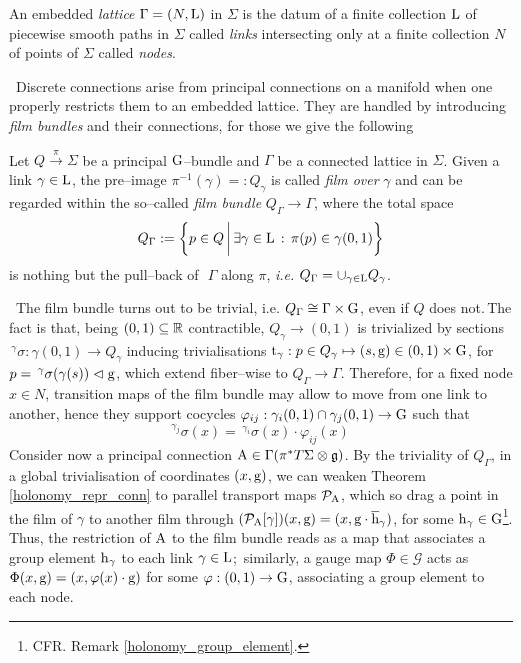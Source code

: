  \begin{defi}[Lattice]
    An embedded \emph{lattice} $\Gamma=(N,\text{\normalfont L})$ in $\Sigma$ is the datum of a finite collection $\text{\normalfont L}$ of piecewise smooth paths in $\Sigma$ called \emph{links} intersecting only at a finite collection $N$ of points of $\Sigma$ called \emph{nodes}. 
\end{defi}
\,\newline
 Discrete connections arise from principal connections on a manifold when one properly restricts them to an embedded lattice. They are handled by introducing \emph{film bundles} %
 and their connections, for those we give the following
\begin{defi}
    Let $Q\xrightarrow{\pi}\Sigma$ be a principal $\text{\normalfont G}$--bundle and $\Gamma$ be a connected lattice in $\Sigma$. Given a link $\gamma\in\text{\normalfont L}$, the pre--image $\pi^{-1}(\gamma)=:Q_\gamma$ is called \emph{film over} $\gamma$ and can be regarded within the so--called \emph{film bundle} $Q_\Gamma\to\Gamma$, where the total space
    $$Q_\Gamma:=\bigg\{p\in Q\,\bigg|\,\exists\gamma\in\text{\normalfont L}\,:\,\pi(p)\in\gamma(0,1)\bigg\}$$
    is nothing but the pull--back of \,\,$\Gamma$ along $\pi$, \emph{i.e.} $Q_\Gamma=\cup_{\gamma\in\text{\normalfont L}}Q_\gamma$.
\end{defi}
\,\newline
The film bundle turns out to be trivial, i.e. $Q_\Gamma\cong\Gamma\times\text{\normalfont G}$, even if $Q$ does not.\,The fact is that, being $(0,1)\subseteq\mathbb{R}$ contractible, $Q_\gamma\to(0,1)$ is trivialized by sections $\,^\gamma\sigma:\gamma(0,1)\to Q_\gamma$ inducing trivialisations $\text{\normalfont t}_\gamma:p\in Q_\gamma\mapsto(s,\text{\normalfont g})\in(0,1)\times\text{\normalfont G}$, for $p=\,^\gamma\sigma(\gamma(s))\vartriangleleft\text{\normalfont g}$, which extend fiber--wise to $Q_\Gamma\to\Gamma$. Therefore, for a fixed node $x\in N$, transition maps of the film bundle may allow to move from one link to another, hence they support cocycles $\varphi_{ij}:\gamma_i(0,1)\cap\gamma_j(0,1)\to\text{\normalfont G}$ such that
$$\,^{\gamma_j}\sigma(x)=\,^{\gamma_i}\sigma(x)\cdot\varphi_{ij}(x)\
$$
Consider now a principal connection $\text{\normalfont A}\in\Gamma(\pi^*T\Sigma\otimes\mathfrak{g})$. By the triviality of $Q_\Gamma$, in a global trivialisation of coordinates $(x,\text{\normalfont g})$, we can weaken Theorem \ref{holonomy_repr_conn} to parallel transport maps $\mathcal{P}_{\text{\normalfont A}}$, which so drag a point in the film of $\gamma$ to another film through $(\mathcal{P}_{\text{\normalfont A}}[\gamma])(x,\text{\normalfont g})=(x,\text{\normalfont g}\cdot\overline{\text{\normalfont h}}_\gamma)$, for some $\text{\normalfont h}_\gamma\in\text{\normalfont G}$\footnote{CFR. Remark \ref{holonomy_group_element}.}. Thus, the restriction of $\text{\normalfont A}$ to the film bundle reads as a map that associates a group element $\text{\normalfont h}_\gamma$ to each link $\gamma\in\text{\normalfont L}$;\, similarly, a gauge map $\Phi\in\mathscr{G}$ acts as $\Phi(x,\text{\normalfont g})=(x,\varphi(x)\cdot\text{\normalfont g})$ for some $\varphi:(0,1)\to\text{\normalfont G}$, associating a group element to each node.

